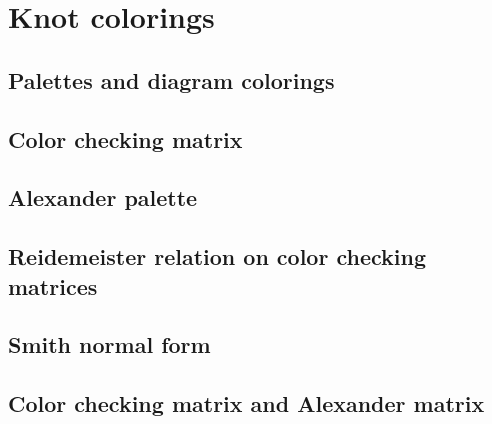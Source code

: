 \section{Knot colorings}\label{sec3}

\subsection{Palettes and diagram colorings}



\subsection{Color checking matrix}
\label{section 3.2}



\subsection{Alexander palette}



\subsection{Reidemeister relation on color checking matrices}



\subsection{Smith normal form}



\subsection{Color checking matrix and Alexander matrix}



